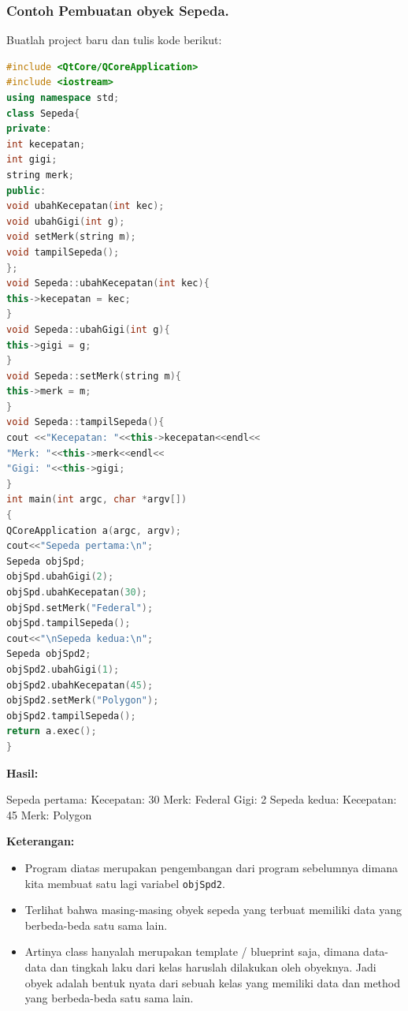 \subsubsection*{Contoh  Pembuatan obyek Sepeda.}

Buatlah project baru dan tulis kode berikut:

\begin{lstlisting}[language=c++, caption=Pembuatan obyek Sepeda, label=contoh6-2]
#include <QtCore/QCoreApplication>
#include <iostream>
using namespace std;
class Sepeda{
private:
int kecepatan;
int gigi;
string merk;
public:
void ubahKecepatan(int kec);
void ubahGigi(int g);
void setMerk(string m);
void tampilSepeda();
};
void Sepeda::ubahKecepatan(int kec){
this->kecepatan = kec;
}
void Sepeda::ubahGigi(int g){
this->gigi = g;
}
void Sepeda::setMerk(string m){
this->merk = m;
}
void Sepeda::tampilSepeda(){
cout <<"Kecepatan: "<<this->kecepatan<<endl<<
"Merk: "<<this->merk<<endl<<
"Gigi: "<<this->gigi;
}
int main(int argc, char *argv[])
{
QCoreApplication a(argc, argv);
cout<<"Sepeda pertama:\n";
Sepeda objSpd;
objSpd.ubahGigi(2);
objSpd.ubahKecepatan(30);
objSpd.setMerk("Federal");
objSpd.tampilSepeda();
cout<<"\nSepeda kedua:\n";
Sepeda objSpd2;
objSpd2.ubahGigi(1);
objSpd2.ubahKecepatan(45);
objSpd2.setMerk("Polygon");
objSpd2.tampilSepeda();
return a.exec();
}
\end{lstlisting}

\textbf{Hasil:}

\begin{lcverbatim}
Sepeda pertama:
Kecepatan: 30
Merk: Federal
Gigi: 2
Sepeda kedua:
Kecepatan: 45
Merk: Polygon
\end{lcverbatim}

\textbf{Keterangan:}

\begin{itemize}

\item
  Program diatas merupakan pengembangan dari program sebelumnya dimana
  kita membuat satu lagi variabel \texttt{objSpd2}.
\item
  Terlihat bahwa masing-masing obyek sepeda yang terbuat memiliki data
  yang berbeda-beda satu sama lain.
\item
  Artinya class hanyalah merupakan template / blueprint saja, dimana
  data-data dan tingkah laku dari kelas haruslah dilakukan oleh
  obyeknya. Jadi obyek adalah bentuk nyata dari sebuah kelas yang
  memiliki data dan method yang berbeda-beda satu sama lain.
\end{itemize}

